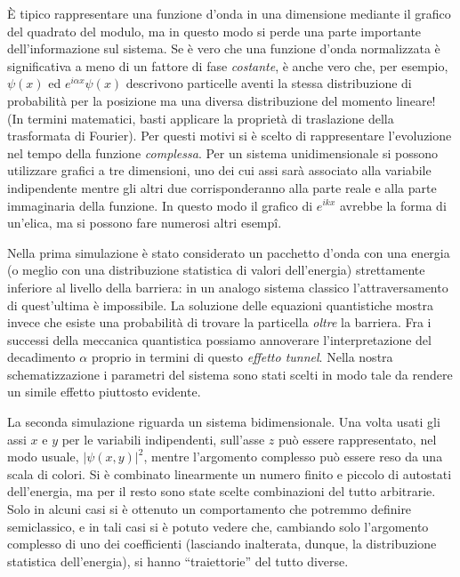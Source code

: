 \`E tipico rappresentare una funzione d'onda in una dimensione
mediante il grafico del quadrato del modulo, ma in questo modo
si perde una parte importante dell'informazione sul sistema. 
Se è vero che una funzione d'onda normalizzata è significativa a 
meno di un fattore di fase \emph{costante}, è anche
vero che, per esempio, $\psi(x)$ ed $e^{i\alpha x}\psi(x)$
descrivono particelle aventi la stessa distribuzione di probabilità 
per la posizione ma una
diversa distribuzione del momento lineare! (In termini
matematici, basti applicare la proprietà di traslazione della
trasformata di Fourier). Per questi motivi si è scelto di rappresentare 
l'evoluzione nel tempo 
della funzione \emph{complessa}. Per un sistema unidimensionale
si possono utilizzare grafici a tre dimensioni, uno dei cui assi sarà
associato alla variabile indipendente mentre gli altri due corrisponderanno
alla parte reale e alla parte immaginaria della funzione. In questo
modo il grafico di $e^{ikx}$ avrebbe la forma di un'elica, ma si possono 
fare numerosi altri esemp\^{i}. 

Nella prima simulazione è stato considerato un pacchetto d'onda con una 
energia (o meglio con una
distribuzione statistica di valori dell'energia) strettamente inferiore
al livello della barriera: in un analogo sistema classico l'attraversamento
di quest'ultima è impossibile. La soluzione delle equazioni quantistiche
mostra invece che esiste una probabilità di trovare la particella
\emph{oltre} la barriera. Fra i successi della meccanica quantistica
possiamo annoverare l'interpretazione del decadimento $\alpha$ 
proprio in termini di questo \emph{effetto tunnel}. Nella
nostra schematizzazione i parametri del sistema sono stati scelti
in modo tale da rendere un simile effetto piuttosto evidente.

La seconda simulazione riguarda un sistema bidimensionale. %
Una volta usati gli assi $x$ e $y$ per le variabili indipendenti,
sull'asse $z$ può essere rappresentato, nel modo usuale, $|\psi(x,y)|^2$,
mentre l'argomento complesso può essere reso da una scala di colori.
Si è combinato linearmente un numero finito e piccolo di autostati 
dell'energia, ma per 
il resto sono state scelte combinazioni del tutto arbitrarie. Solo in alcuni
casi si è ottenuto un comportamento che potremmo definire
semiclassico, e in tali casi si è potuto vedere che, cambiando solo 
l'argomento complesso di uno dei coefficienti (lasciando
inalterata, dunque, la distribuzione statistica dell'energia), si 
hanno ``traiettorie'' del tutto diverse. 

